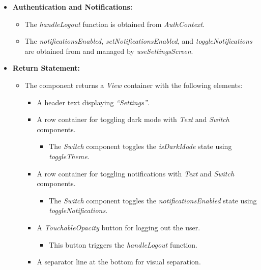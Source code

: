 \begin{itemize}
    \item \textbf{Authentication and Notifications:}
    \begin{itemize}
        \item The \textit{handleLogout} function is obtained from \textit{AuthContext}.
        \item The \textit{notificationsEnabled}, \textit{setNotificationsEnabled}, and \textit{toggleNotifications} are obtained from and managed by \textit{useSettingsScreen}.
    \end{itemize}

    \item \textbf{Return Statement:}
    \begin{itemize}
        \item The component returns a \textit{View} container with the following elements:
        \begin{itemize}
            \item A header text displaying \textit{``Settings''}.
            \item A row container for toggling dark mode with \textit{Text} and \textit{Switch} components.
            \begin{itemize}
                \item The \textit{Switch} component toggles the \textit{isDarkMode} state using \textit{toggleTheme}.
            \end{itemize}
            \item A row container for toggling notifications with \textit{Text} and \textit{Switch} components.
            \begin{itemize}
                \item The \textit{Switch} component toggles the \textit{notificationsEnabled} state using \textit{toggleNotifications}.
            \end{itemize}
            \item A \textit{TouchableOpacity} button for logging out the user.
            \begin{itemize}
                \item This button triggers the \textit{handleLogout} function.
            \end{itemize}
            \item A separator line at the bottom for visual separation.
        \end{itemize}
    \end{itemize}
\end{itemize}

